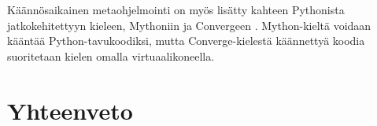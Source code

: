 \documentclass[finnish]{tktltiki2}
\theoremstyle{definition}
\theoremstyle{remark}
\begin{document}
Käännösaikainen metaohjelmointi on myös lisätty kahteen Pythonista jatkokehitettyyn kieleen, Mythoniin \cite{mython} ja Convergeen \cite{tratt05}. Mython-kieltä voidaan kääntää Python-tavukoodiksi, mutta Converge-kielestä käännettyä koodia suoritetaan kielen omalla virtuaalikoneella.


\section{Yhteenveto}



\pagebreak

%
%
% 
%




\lastpage
\end{document}
